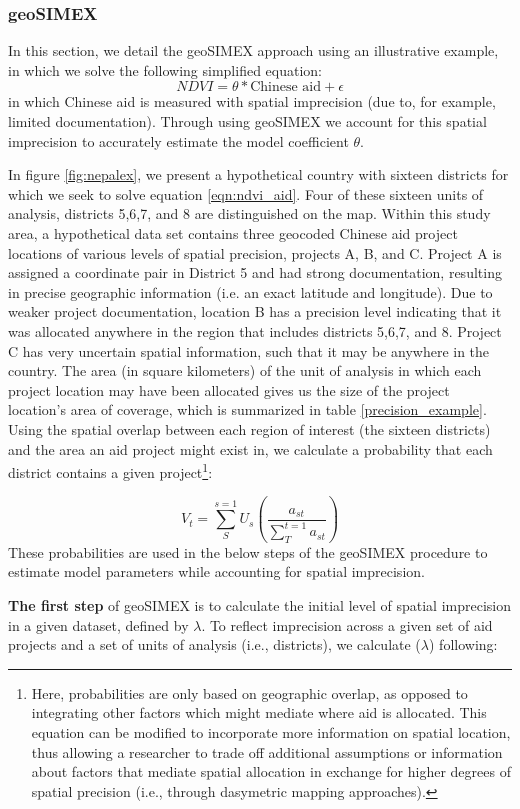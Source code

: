\subsubsection{geoSIMEX}
In this section, we detail the geoSIMEX approach using an illustrative example, in which we solve the following simplified equation:
\begin{equation}
NDVI = \theta * \text{Chinese aid} + \epsilon
\label{eqn:ndvi_aid}
\end{equation}
in which Chinese aid is measured with spatial imprecision (due to, for example, limited documentation). 
Through using geoSIMEX we account for this spatial imprecision to accurately estimate the model coefficient $\theta$. 
\par
In figure \ref{fig:nepalex}, we present a hypothetical country with sixteen districts for which we seek to solve equation \ref{eqn:ndvi_aid}. 
Four of these sixteen units of analysis, districts 5,6,7, and 8 are distinguished on the map. 
Within this study area, a hypothetical data set contains three geocoded Chinese aid project locations of various levels of spatial precision, projects A, B, and C. 
Project A is assigned a coordinate pair in District 5 and had strong documentation, resulting
in precise geographic information (i.e. an exact latitude and longitude). 
Due to weaker project documentation, location B has a precision level indicating that it was allocated anywhere in the region that includes districts 5,6,7, and 8. 
Project C has very uncertain spatial information, such that it may be anywhere in the country. 
The area (in square kilometers) of the unit of analysis in which each project location may have been allocated gives us the size of the project location's area of coverage, which is summarized in table \ref{precision_example}.
Using the spatial overlap between each region of interest (the sixteen districts) and the area an aid project might exist in, we calculate a probability that each district contains a given project\footnote{Here, probabilities are only based on geographic overlap, as opposed to integrating other factors which might mediate where aid is allocated. This equation can be modified to incorporate more information on spatial location, thus allowing a researcher to trade off additional assumptions or information about factors that mediate spatial allocation in exchange for higher degrees of spatial precision (i.e., through dasymetric mapping approaches).}:

\begin{equation}\label{eq:overlaps}
V_{t} = \sum_{S}^{s=1}U_{s}\left ( \frac{a_{st}}{\sum_{T}^{t=1}a_{st}} \right )
\end{equation}
\noindent 
These probabilities are used in the below steps of the geoSIMEX procedure to estimate model parameters while accounting for spatial imprecision.
\par
\textbf{The first step} of geoSIMEX is to calculate the initial level of spatial imprecision in a given dataset, defined by $\lambda$.
To reflect imprecision across a given set of aid projects and a set of units of analysis (i.e., districts), we calculate (\begin{math}\lambda\end{math}) following:


